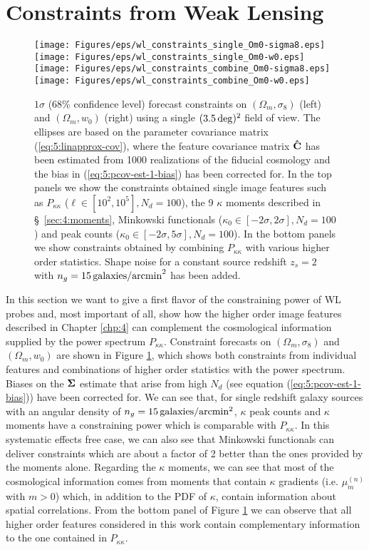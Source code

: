 \section{Constraints from Weak Lensing}
\label{sec:5:constraints}
%
\begin{figure}
\begin{center}
\texttt{[image: Figures/eps/wl\_constraints\_single\_Om0-sigma8.eps]} \texttt{[image: Figures/eps/wl\_constraints\_single\_Om0-w0.eps]}
\texttt{[image: Figures/eps/wl\_constraints\_combine\_Om0-sigma8.eps]} \texttt{[image: Figures/eps/wl\_constraints\_combine\_Om0-w0.eps]}
\end{center}
\caption{$1\sigma$ (68\% confidence level) forecast constraints on $(\Omega_m,\sigma_8)$ (left) and $(\Omega_m,w_0)$ (right) using a single $(3.5\,{\rm deg})^2$ field of view. The ellipses are based on the parameter covariance matrix (\ref{eq:5:linapprox-cov}), where the feature covariance matrix $\mathbf{\hat{C}}$ has been estimated from 1000 realizations of the fiducial cosmology and the bias in (\ref{eq:5:pcov-est-1-bias}) has been corrected for. In the top panels we show the constraints obtained single image features such as $P_{\kappa\kappa}$ ($\ell \in [10^2,10^5],N_d=100$), the 9 $\kappa$ moments described in \S~\ref{sec:4:moments}, Minkowski functionals ($\kappa_0\in[-2\sigma,2\sigma], N_d=100$) and peak counts ($\kappa_0\in[-2\sigma,5\sigma], N_d=100$). In the bottom panels we show constraints obtained by combining $P_{\kappa\kappa}$ with various higher order statistics. Shape noise for a constant source redshift $z_s=2$ with $n_g=15\,{\rm galaxies/arcmin}^2$ has been added.}
\label{fig:5:wlconstraints}
\end{figure}
%
In this section we want to give a first flavor of the constraining power of WL probes and, most important of all, show how the higher order image features described in Chapter \ref{chp:4} can complement the cosmological information supplied by the power spectrum $P_{\kappa\kappa}$. Constraint forecasts on $(\Omega_m,\sigma_8)$ and $(\Omega_m,w_0)$ are shown in Figure \ref{fig:5:wlconstraints}, which shows both constraints from individual features and combinations of higher order statistics with the power spectrum. Biases on the $\mathbf{\Sigma}$ estimate that arise from high $N_d$ (see equation (\ref{eq:5:pcov-est-1-bias})) have been corrected for. We can see that, for single redshift galaxy sources with an angular density of $n_g=15\,{\rm galaxies/arcmin^2}$, $\kappa$ peak counts and $\kappa$ moments have a constraining power which is comparable with $P_{\kappa\kappa}$. In this systematic effects free case, we can also see that Minkowski functionals can deliver constraints which are about a factor of 2 better than the ones provided by the moments alone.
Regarding the $\kappa$ moments, we can see that most of the cosmological information comes from moments that contain $\kappa$ gradients (i.e. $\mu_{m}^{(n)}$ with $m>0$) which, in addition to the PDF of $\kappa$, contain information about spatial correlations. 
From the bottom panel of Figure \ref{fig:5:wlconstraints} we can observe that all higher order features considered in this work contain complementary information to the one contained in $P_{\kappa\kappa}$.    

